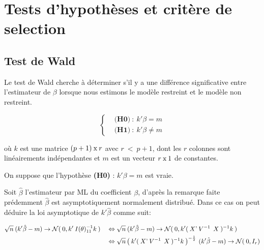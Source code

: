 \documentclass[11pt,fleqn]{book} %
\begin{document}
	
	
	
	
	
	
	\newpage
	
	
	
	\chapter{Tests d'hypothèses et critère de selection}
	
	
	
	\section{Test de Wald}
	
	\vspace{1em} 
	
	Le test de Wald cherche à déterminer s’il y a une différence significative entre l'estimateur de $\beta$ lorsque nous estimons le modèle restreint et le modèle non restreint.
	
	\vspace{1em}
	
	\begin{equation*}
		\left\{\begin{aligned} & \textbf{(H0)} \: : \: k'\beta=m \\
			& \textbf{(H1)} \: : \: k'\beta\neq m \end{aligned} \right.
	\end{equation*}
	
	\vspace{0.5em}
	
	où $k$ est une matrice $(p+1)\:\textnormal{x}\:r$ \: avec $ r\:<\:p+1 $, dont les $r$ colonnes sont linéairements indépendantes et $m$ est un vecteur $r\:\textnormal{x}\: 1$ de constantes.
	
	\vspace{1em}
	
	On suppose que l'hypothèse \textbf{(H0)} : $k'\beta=m$ est vraie.
	
	\vspace{1em}
	
	Soit $\hat{\beta}$ l'estimateur par ML du coefficient $\beta$, d'après la remarque faite prédemment $\hat{\beta}$ est asymptotiquement normalement distribué. Dans ce cas on peut déduire la loi asymptotique de $k'\hat{\beta}$ comme suit:
	
	
	\begin{align*}
		\sqrt{n}\:(k'\hat{\beta}-m)\rightarrow \mathcal{N}(\:0,k'\:I(\theta)_{11}^{-1} k\:) \quad
		&\Leftrightarrow \sqrt{n}\:(k'\hat{\beta}-m)\rightarrow \mathcal{N}(\:0,k' (\:X\textnormal{'} \:V^{-1}\:\: X\:)^{-1} k\:)\\
		&\Leftrightarrow  \sqrt{n} \left(\:k' (\:X\textnormal{'} \:V^{-1}\:\: X\:)^{-1} k\:\right)^{-\frac{1}{2}} \:(k'\hat{\beta}-m) \rightarrow \mathcal{N}(\:0,I_r)
	\end{align*}
	
\end{document}
